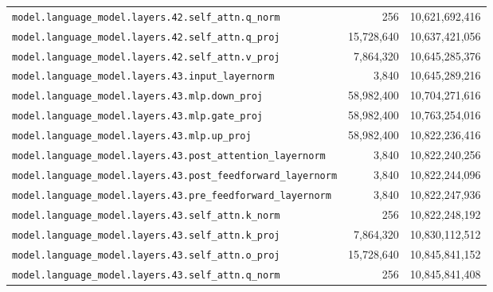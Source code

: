 \documentclass[10pt,a4paper]{article}
\theoremstyle{definition}
\begin{document}
\begin{appendices}
\begin{longtable}{p{9.5cm}rr}
\texttt{model.\allowbreak{}language\_model.\allowbreak{}layers.\allowbreak{}42.\allowbreak{}self\_attn.\allowbreak{}q\_norm} & 256 & 10,621,692,416 \\
\texttt{model.\allowbreak{}language\_model.\allowbreak{}layers.\allowbreak{}42.\allowbreak{}self\_attn.\allowbreak{}q\_proj} & 15,728,640 & 10,637,421,056 \\
\texttt{model.\allowbreak{}language\_model.\allowbreak{}layers.\allowbreak{}42.\allowbreak{}self\_attn.\allowbreak{}v\_proj} & 7,864,320 & 10,645,285,376 \\
\texttt{model.\allowbreak{}language\_model.\allowbreak{}layers.\allowbreak{}43.\allowbreak{}input\_layernorm} & 3,840 & 10,645,289,216 \\
\texttt{model.\allowbreak{}language\_model.\allowbreak{}layers.\allowbreak{}43.\allowbreak{}mlp.\allowbreak{}down\_proj} & 58,982,400 & 10,704,271,616 \\
\texttt{model.\allowbreak{}language\_model.\allowbreak{}layers.\allowbreak{}43.\allowbreak{}mlp.\allowbreak{}gate\_proj} & 58,982,400 & 10,763,254,016 \\
\texttt{model.\allowbreak{}language\_model.\allowbreak{}layers.\allowbreak{}43.\allowbreak{}mlp.\allowbreak{}up\_proj} & 58,982,400 & 10,822,236,416 \\
\texttt{model.\allowbreak{}language\_model.\allowbreak{}layers.\allowbreak{}43.\allowbreak{}post\_attention\_layernorm} & 3,840 & 10,822,240,256 \\
\texttt{model.\allowbreak{}language\_model.\allowbreak{}layers.\allowbreak{}43.\allowbreak{}post\_feedforward\_layernorm} & 3,840 & 10,822,244,096 \\
\texttt{model.\allowbreak{}language\_model.\allowbreak{}layers.\allowbreak{}43.\allowbreak{}pre\_feedforward\_layernorm} & 3,840 & 10,822,247,936 \\
\texttt{model.\allowbreak{}language\_model.\allowbreak{}layers.\allowbreak{}43.\allowbreak{}self\_attn.\allowbreak{}k\_norm} & 256 & 10,822,248,192 \\
\texttt{model.\allowbreak{}language\_model.\allowbreak{}layers.\allowbreak{}43.\allowbreak{}self\_attn.\allowbreak{}k\_proj} & 7,864,320 & 10,830,112,512 \\
\texttt{model.\allowbreak{}language\_model.\allowbreak{}layers.\allowbreak{}43.\allowbreak{}self\_attn.\allowbreak{}o\_proj} & 15,728,640 & 10,845,841,152 \\
\texttt{model.\allowbreak{}language\_model.\allowbreak{}layers.\allowbreak{}43.\allowbreak{}self\_attn.\allowbreak{}q\_norm} & 256 & 10,845,841,408 \\

\end{longtable}
\end{appendices}
\end{document}
